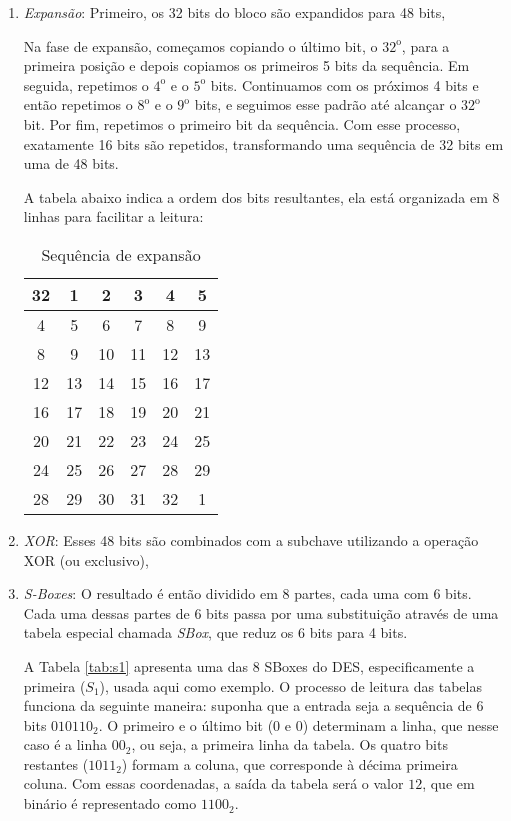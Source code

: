 \begin{enumerate}
\item {\em Expansão}: Primeiro, os 32 bits do bloco são expandidos para 48 bits,

  Na fase de expansão, começamos copiando o último bit, o $32^\text{o}$, para a primeira posição e depois copiamos os primeiros 5 bits da sequência.
  Em seguida, repetimos o $4^\text{o}$ e o $5^\text{o}$ bits.
  Continuamos com os próximos 4 bits e então repetimos o $8^\text{o}$ e o $9^\text{o}$ bits, e seguimos esse padrão até alcançar o $32^\text{o}$ bit.
  Por fim, repetimos o primeiro bit da sequência.
  Com esse processo, exatamente 16 bits são repetidos, transformando uma sequência de 32 bits em uma de 48 bits.

  A tabela abaixo indica a ordem dos bits resultantes, ela está organizada em 8 linhas para facilitar a leitura:
  
\begin{table}[h!]
\centering
\begin{tabular}{|*{6}{c|}}
\hline
32 & 1  & 2  & 3  & 4  & 5  \\
\hline
4  & 5  & 6  & 7  & 8  & 9  \\
\hline
8  & 9  & 10 & 11 & 12 & 13 \\
\hline
12 & 13 & 14 & 15 & 16 & 17 \\
\hline
16 & 17 & 18 & 19 & 20 & 21 \\
\hline
20 & 21 & 22 & 23 & 24 & 25 \\
\hline
24 & 25 & 26 & 27 & 28 & 29 \\
\hline
28 & 29 & 30 & 31 & 32 & 1  \\
\hline
\end{tabular}
\caption{Sequência de expansão}
\end{table}

    \item {\em XOR}: Esses 48 bits são combinados com a subchave utilizando a operação XOR (ou exclusivo),
    \item {\em S-Boxes}: O resultado é então dividido em 8 partes, cada uma com 6 bits.
      Cada uma dessas partes de 6 bits passa por uma substituição através de uma tabela especial chamada \textit{SBox}, que reduz os 6 bits para 4 bits.

      A Tabela \ref{tab:s1} apresenta uma das 8 SBoxes do DES, especificamente a primeira ($S_1$), usada aqui como exemplo.
      O processo de leitura das tabelas funciona da seguinte maneira:
      suponha que a entrada seja a sequência de 6 bits $010110_2$.
      O primeiro e o último bit ($0$ e $0$) determinam a linha, que nesse caso é a linha $00_2$, ou seja, a primeira linha da tabela.
      Os quatro bits restantes ($1011_2$) formam a coluna, que corresponde à décima primeira coluna.
      Com essas coordenadas, a saída da tabela será o valor $12$, que em binário é representado como $1100_2$.
      

\end{enumerate}
